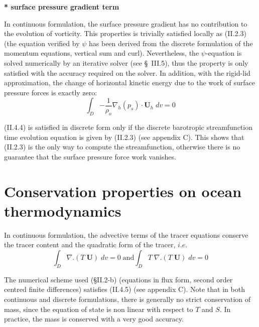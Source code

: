 \documentclass[../main/NEMO_manual]{subfiles}
\begin{document}
\textbf{* surface pressure gradient term}

In continuous formulation, the surface pressure gradient has no contribution to the evolution of vorticity.
This properties is trivially satisfied locally as (II.2.3)
(the equation verified by $\psi$ has been derived from the discrete formulation of the momentum equations,
vertical sum and curl).
Nevertheless, the $\psi$-equation is solved numerically by an iterative solver (see {\S}~III.5),
thus the property is only satisfied with the accuracy required on the solver.
In addition, with the rigid-lid approximation, the change of horizontal kinetic energy due to the work of 
surface pressure forces is exactly zero:
\[
  \int_D {-\frac{1}{\rho_o }\nabla _h } \left( {p_s } \right)\cdot {\textbf{U}}_h \;dv=0
\]

(II.4.4) is satisfied in discrete form only if
the discrete barotropic streamfunction time evolution equation is given by (II.2.3) (see appendix C).
This shows that (II.2.3) is the only way to compute the streamfunction,
otherwise there is no guarantee that the surface pressure force work vanishes.

\section{Conservation properties on ocean thermodynamics}
\label{sec:Invariant_tra}

In continuous formulation, the advective terms of the tracer equations conserve the tracer content and
the quadratic form of the tracer, $i.e.$
\[
  \int_D {\nabla .\left( {T\;{\textbf{U}}} \right)\;dv} =0
  \;\text{and}
  \int_D {T\;\nabla .\left( {T\;{\textbf{U}}} \right)\;dv} =0
\]

The numerical scheme used ({\S}II.2-b) (equations in flux form, second order centred finite differences) satisfies
(II.4.5) (see appendix C).
Note that in both continuous and discrete formulations, there is generally no strict conservation of mass,
since the equation of state is non linear with respect to $T$ and $S$.
In practice, the mass is conserved with a very good accuracy. 

\end{document}
